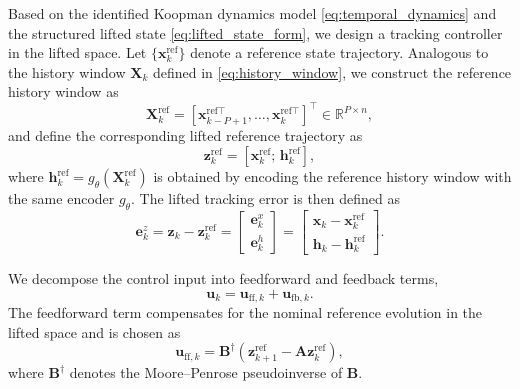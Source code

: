 \documentclass[journal]{IEEEtran}
\newcommand{\vx}{\mathbf{x}}
\newcommand{\vu}{\mathbf{u}}
\newcommand{\vz}{\mathbf{z}}
\newcommand{\vh}{\mathbf{h}}
\newcommand{\ve}{\mathbf{e}}
\newcommand{\mA}{\mathbf{A}}
\newcommand{\mB}{\mathbf{B}}
\newcommand{\mX}{\mathbf{X}}
\begin{document}
Based on the identified Koopman dynamics model \eqref{eq:temporal_dynamics} and the structured lifted state \eqref{eq:lifted_state_form}, we design a tracking controller in the lifted space. Let $\{\vx_k^{\mathrm{ref}}\}$ denote a reference state trajectory. Analogous to the history window $\mX_k$ defined in \eqref{eq:history_window}, we construct the reference history window as
\begin{equation}
    \mX_k^{\mathrm{ref}} = [\vx_{k-P+1}^{\mathrm{ref}\top}, \ldots, \vx_k^{\mathrm{ref}\top}]^\top \in \mathbb{R}^{P\times n},
    \label{eq:ref_history_window}
\end{equation}
and define the corresponding lifted reference trajectory as
\begin{equation}
    \vz_k^{\mathrm{ref}} = [\vx_k^{\mathrm{ref}};\,\vh_k^{\mathrm{ref}}],
    \label{eq:lifted_reference}
\end{equation}
where $\vh_k^{\mathrm{ref}} = g_\theta(\mX_k^{\mathrm{ref}})$ is obtained by encoding the reference history window with the same encoder $g_\theta$. The lifted tracking error is then defined as
\begin{equation}
    \ve_k^z = \vz_k - \vz_k^{\mathrm{ref}}
    =
    \begin{bmatrix}
        \ve_k^x \\ \ve_k^h
    \end{bmatrix}
    =
    \begin{bmatrix}
        \vx_k - \vx_k^{\mathrm{ref}} \\
        \vh_k - \vh_k^{\mathrm{ref}}
    \end{bmatrix}.
    \label{eq:structured_error}
\end{equation}

We decompose the control input into feedforward and feedback terms,
\begin{equation}
    \vu_k = \vu_{\mathrm{ff},k} + \vu_{\mathrm{fb},k}.
    \label{eq:control_decomposition}
\end{equation}
The feedforward term compensates for the nominal reference evolution in the lifted space and is chosen as
\begin{equation}
    \vu_{\mathrm{ff},k}
    =
    \mB^\dagger \!\left(\vz_{k+1}^{\mathrm{ref}} - \mA \vz_k^{\mathrm{ref}}\right),
    \label{eq:feedforward}
\end{equation}
where $\mB^\dagger$ denotes the Moore--Penrose pseudoinverse of $\mB$.
\end{document}
